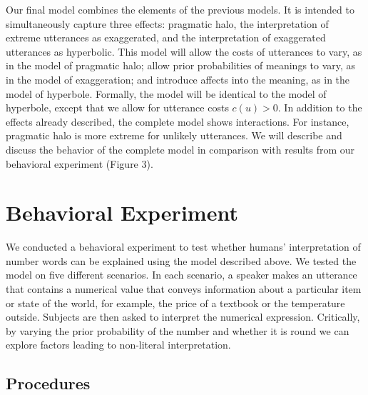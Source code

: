 \documentclass{article} %
\begin{document}
Our final model combines the elements of the previous models. It is intended to simultaneously capture three effects: pragmatic halo, the interpretation of extreme utterances as exaggerated, and the interpretation of exaggerated utterances as hyperbolic. This model will allow the costs of utterances to vary, as in the model of pragmatic halo; allow prior probabilities of meanings to vary, as in the model of exaggeration; and introduce affects into the meaning, as in the model of hyperbole. Formally, the model will be identical to the model of hyperbole, except that we allow for utterance costs $c(u) > 0$. In addition to the effects already described, the complete model shows interactions. For instance, pragmatic halo is more extreme for unlikely utterances. We will describe and discuss the behavior of the complete model in comparison with results from our behavioral experiment (Figure 3).

\section{Behavioral Experiment}

We conducted a behavioral experiment to test whether humans' interpretation of number words can be explained using the model described above. We tested the model on five different scenarios. In each scenario, a speaker makes an utterance that contains a numerical value that conveys information about a particular item or state of the world, for example, the price of a textbook or the temperature outside. Subjects are then asked to interpret the numerical expression. Critically, by varying the prior probability of the number and whether it is round we can explore factors leading to non-literal interpretation.

\subsection{Procedures}
\end{document}
